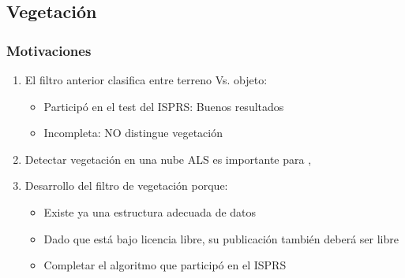 \subsection{Vegetación}
\begin{frame}
  \frametitle{Motivaciones}
  \begin{enumerate}[<+->]
    \item El filtro anterior clasifica entre \alert{terreno} Vs. \alert{objeto}: 
  \begin{itemize}[<+->]
    \item Participó en el test del ISPRS: Buenos resultados
    \item Incompleta: \alert<3>{NO distingue vegetación}
  \end{itemize}
    \item Detectar vegetación en una nube ALS es importante para
      ,
       
    \item Desarrollo del filtro de vegetación porque:
    \begin{itemize}[<+->]
    \item Existe ya una estructura adecuada de datos
    \item Dado que está bajo licencia libre, su publicación también deberá ser
      libre
    \item Completar el algoritmo que participó en el ISPRS
    \end{itemize}
\end{enumerate}
\end{frame}

